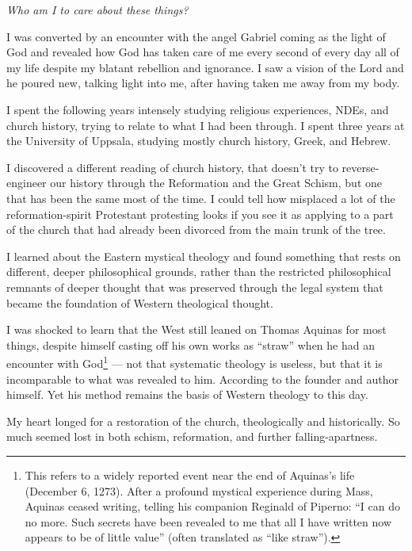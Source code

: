 \documentclass[10pt,twoside,openany]{book}
\begin{document}
\bigskip

\begingroup
\setlength{\parindent}{0pt}
\itshape
Who am I to care about these things?
\endgroup

\bigskip

I was converted by an encounter with the angel Gabriel coming as the
light of God and revealed how God has taken care of me every second of
every day all of my life despite my blatant rebellion and ignorance. I
saw a vision of the Lord and he poured new, talking light into me,
after having taken me away from my body.

I spent the following years intensely studying religious experiences,
NDEs, and church history, trying to relate to what I had been through.
I spent three years at the University of Uppsala, studying mostly
church history, Greek, and Hebrew.

I discovered a different reading of church history, that doesn't try to
reverse-engineer our history through the Reformation and the Great
Schism, but one that has been the same most of the time. I could tell
how misplaced a lot of the reformation-spirit Protestant protesting
looks if you see it as applying to a part of the church that had
already been divorced from the main trunk of the tree.

I learned about the Eastern mystical theology and found something that
rests on different, deeper philosophical grounds, rather than the
restricted philosophical remnants of deeper thought that was preserved
through the legal system that became the foundation of Western
theological thought.

I was shocked to learn that the West still leaned on Thomas Aquinas for
most things, despite himself casting off his own works as ``straw'' when
he had an encounter with God\footnote{This refers to a widely reported event near the end of Aquinas's life (December 6, 1273). After a profound mystical experience during Mass, Aquinas ceased writing, telling his companion Reginald of Piperno: ``I can do no more. Such secrets have been revealed to me that all I have written now appears to be of little value'' (often translated as ``like straw'').} --- not that systematic theology is useless,
but that it is incomparable to what was revealed to him. According to
the founder and author himself. Yet his method remains the basis of
Western theology to this day.

My heart longed for a restoration of the church, theologically and
historically. So much seemed lost in both schism, reformation, and
further falling-apartness.
\end{document}
